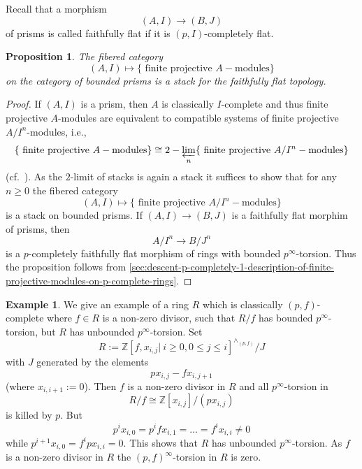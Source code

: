 \documentclass{amsart}
\theoremstyle{plain}
\newtheorem{proposition}[theorem]{Proposition}
\theoremstyle{definition}
\newtheorem{example}[theorem]{Example}
\newcommand{\Z}{\mathbb{Z}}
\begin{document}
  Recall that a morphism
  $$
  (A,I)\to (B,J)
  $$
  of prisms is called faithfully flat if it is $(p,I)$-completely flat.

  \begin{proposition}
    \label{sec:descent-p-completely-1-proposition-descent-of-finite-projective-modules-for-faithfully-morphisms-of-prisms}
    The fibered category
    $$
    (A,I)\mapsto \{\text{ finite projective }A-\text{modules}\}
    $$
    on the category of bounded prisms is a stack for the faithfully flat topology.
  \end{proposition}
  \begin{proof}
    If $(A,I)$ is a prism, then $A$ is classically $I$-complete and thus finite projective $A$-modules are equivalent to compatible systems of finite projective $A/I^n$-modules, i.e.,
    $$
    \{\text{ finite projective }A-\text{modules}\}\cong 2-\varprojlim\limits_n\{\text{ finite projective }A/I^n-\text{modules}\}
    $$
    (cf.\ \cite[Tag 0D4B]{stacks_project}).
    As the $2$-limit of stacks is again a stack it suffices to show that for any $n\geq 0$ the fibered category
    $$
    (A,I)\mapsto \{\text{ finite projective }A/I^n-\text{modules}\}
    $$
    is a stack on bounded prisms. If $(A,I)\to (B,J)$ is a faithfully flat morphim of prisms, then
    $$
    A/I^n\to B/J^n
    $$
    is a $p$-completely faithfully flat morphism of rings with bounded $p^\infty$-torsion. Thus the proposition follows from \ref{sec:descent-p-completely-1-description-of-finite-projective-modules-on-p-complete-rings}.
  \end{proof}
  
  \begin{example}
    We give an example of a ring $R$ which is classically $(p,f)$-complete where $f\in R$ is a non-zero divisor, such that $R/f$ has bounded $p^\infty$-torsion, but $R$ has unbounded $p^\infty$-torsion.
    Set
    $$
    R:=\Z[f,x_{i,j}|\ i\geq 0, 0\leq j\leq i]^{\wedge_{(p,f)}}/J
    $$
    with $J$ generated by the elements
    $$
    px_{i,j}-fx_{i,j+1}
    $$
    (where $x_{i,i+1}:=0$).
    Then $f$ is a non-zero divisor in $R$ and all $p^\infty$-torsion in 
    $$
    R/f\cong \Z[x_{i,j}]/(px_{i,j})
    $$
    is killed by $p$. But
    $$
    p^{i}x_{i,0}=p^{i}fx_{i,1}=\ldots = f^{i}x_{i,i}\neq 0
    $$
    while $p^{i+1}x_{i,0}=f^ipx_{i,i}=0$.
    This shows that $R$ has unbounded $p^\infty$-torsion.
    As $f$ is a non-zero divisor in $R$ the $(p,f)^\infty$-torsion in $R$ is zero.
  \end{example}

\newpage



\end{document}
